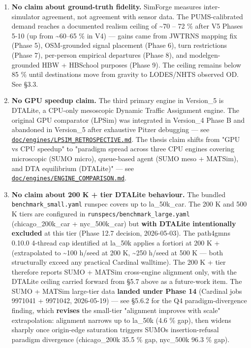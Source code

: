 \begin{enumerate}
\def\labelenumi{\arabic{enumi}.}
\tightlist
\item
  \textbf{No claim about ground-truth fidelity.} SimForge measures
  inter-simulator agreement, not agreement with sensor data. The
  PUMS-calibrated demand reaches a documented realism ceiling of
  \textasciitilde70 -- 72 \% after V5 Phases 5-10 (up from
  \textasciitilde60--65 \% in V4) --- gains came from JWTRNS mapping fix
  (Phase 5), OSM-grounded signal placement (Phase 6), turn restrictions
  (Phase 7), per-person empirical departures (Phase 8), and
  modelgen-grounded HBW + HBSchool purposes (Phase 9). The ceiling
  remains below 85 \% until destinations move from gravity to LODES/NHTS
  observed OD. See §3.3.
\item
  \textbf{No GPU speedup claim.} The third primary engine in Version\_5
  is DTALite, a CPU-only mesoscopic Dynamic Traffic Assignment engine.
  The original GPU comparator (LPSim) was integrated in Version\_4 Phase
  B and abandoned in Version\_5 after exhaustive Pitzer debugging ---
  see
  \href{../engines/LPSIM_RETROSPECTIVE.md}{\texttt{doc/engines/LPSIM\_RETROSPECTIVE.md}}.
  The thesis claim shifts from "GPU vs CPU speedup" to "paradigm spread
  across three CPU engines covering microscopic (SUMO micro),
  queue-based agent (SUMO meso + MATSim), and DTA equilibrium (DTALite)"
  --- see
  \href{../engines/ENGINE_COMPARISON.md}{\texttt{doc/engines/ENGINE\_COMPARISON.md}}.
\item
  \textbf{No claim about 200 K + tier DTALite behaviour.} The bundled
  \texttt{benchmark\_small.yaml} runspec covers up to la\_50k\_car. The
  200 K and 500 K tiers are configured in
  \texttt{runspecs/benchmark\_large.yaml} (chicago\_200k\_car +
  nyc\_500k\_car) but \textbf{with DTALite intentionally excluded} at
  this tier (Phase 12.7 decision, 2026-05-03). The path4gmns 0.10.0
  4-thread cap identified at la\_50k applies a fortiori at 200 K +
  (extrapolated to \textasciitilde100 h/seed at 200 K,
  \textasciitilde250 h/seed at 500 K --- both structurally exceed any
  practical Cardinal walltime). The 200 K + tier therefore reports SUMO
  + MATSim cross-engine alignment only, with the DTALite ceiling carried
  forward from §5.7 above as a future-work item. The SUMO + MATSim
  large-tier data \textbf{landed under Phase 14} (Cardinal jobs 9971041
  + 9971042, 2026-05-19) --- see §5.6.2 for the Q4 paradigm-divergence
  finding, which \textbf{revises} the small-tier "alignment improves
  with scale" extrapolation: alignment narrows up to la\_50k (4.6 \%
  gap), then widens sharply once origin-edge saturation triggers
  SUMO\textquotesingle s insertion-refusal paradigm divergence
  (chicago\_200k 35.5 \% gap, nyc\_500k 96.3 \% gap).
\end{enumerate}

